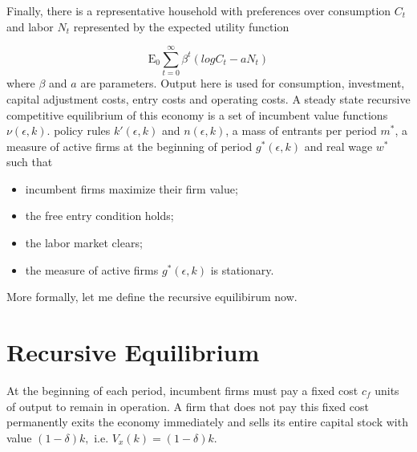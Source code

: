 \documentclass[]{article}
\begin{document}
Finally, there is a representative household with preferences over consumption $C_{t}$ and labor $N_{t}$ represented by the expected utility function

$$\mathrm E_{0} \sum_{t=0}^{\infty} \beta^{t}(log C_{t}- aN_{t})$$
where $\beta$ and $a$ are parameters. Output here is used for consumption, investment, capital adjustment costs, entry costs and operating costs. A steady state recursive competitive equilibrium of this economy is a set of incumbent value functions  $\nu(\epsilon,k)$. policy rules $k'(\epsilon,k)$ and $n(\epsilon,k)$, a mass of entrants per period $m^{*}$, a measure of active firms at the beginning of period $g^{*}(\epsilon,k)$ and real wage $w^{*}$ such that 

\begin{itemize}

\item incumbent firms maximize their firm value;

\item the free entry condition holds;

\item the labor market clears;

\item the measure of active firms $g^{*}(\epsilon,k)$ is stationary.

\end{itemize}

More formally, let me define the recursive equilibirum now.

\section{Recursive Equilibrium}

At the beginning of each period, incumbent firms must pay a fixed cost \( c_{f} \) units of output to remain in operation. A firm that does not pay this fixed cost permanently exits the economy immediately and sells its entire capital stock with value \( (1-\delta) k, \)
i.e. \( V_{x}(k)=(1-\delta) k \). 
\end{document}
